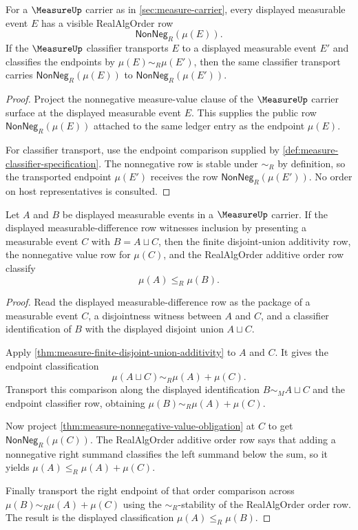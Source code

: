 \begin{theorem}
\label{thm:measure-nonnegative-value-obligation}
For a $\MeasureUp$ carrier as in \autoref{sec:measure-carrier}, every
displayed measurable event $E$ has a visible RealAlgOrder row
$$
\mathsf{NonNeg}_R(\mu(E)).
$$
If the $\MeasureUp$ classifier transports $E$ to a displayed measurable event
$E'$ and classifies the endpoints by $\mu(E)\sim_R\mu(E')$, then the same
classifier transport carries $\mathsf{NonNeg}_R(\mu(E))$ to
$\mathsf{NonNeg}_R(\mu(E'))$.
\end{theorem}
\begin{proof}
Project the nonnegative measure-value clause of the $\MeasureUp$ carrier
surface at the displayed measurable event $E$. This supplies the public row
$\mathsf{NonNeg}_R(\mu(E))$ attached to the same ledger entry as the endpoint
$\mu(E)$.

For classifier transport, use the endpoint comparison supplied by
\autoref{def:measure-classifier-specification}. The nonnegative row is stable
under $\sim_R$ by definition, so the transported endpoint $\mu(E')$ receives
the row $\mathsf{NonNeg}_R(\mu(E'))$. No order on host representatives is
consulted.
\end{proof}

\begin{theorem}
\label{thm:measure-monotone-under-measurable-inclusion}
Let $A$ and $B$ be displayed measurable events in a $\MeasureUp$ carrier. If
the displayed measurable-difference row witnesses inclusion by presenting a
measurable event $C$ with $B=A\sqcup C$, then the finite disjoint-union
additivity row, the nonnegative value row for $\mu(C)$, and the RealAlgOrder
additive order row classify
$$
\mu(A)\le_R\mu(B).
$$
\end{theorem}
\begin{proof}
Read the displayed measurable-difference row as the package of a measurable
event $C$, a disjointness witness between $A$ and $C$, and a classifier
identification of $B$ with the displayed disjoint union $A\sqcup C$.

Apply \autoref{thm:measure-finite-disjoint-union-additivity} to $A$ and $C$.
It gives the endpoint classification
$$
\mu(A\sqcup C)\sim_R\mu(A)+\mu(C).
$$
Transport this comparison along the displayed identification
$B\sim_M A\sqcup C$ and the endpoint classifier row, obtaining
$\mu(B)\sim_R\mu(A)+\mu(C)$.

Now project \autoref{thm:measure-nonnegative-value-obligation} at $C$ to get
$\mathsf{NonNeg}_R(\mu(C))$. The RealAlgOrder additive order row says that
adding a nonnegative right summand classifies the left summand below the sum,
so it yields $\mu(A)\le_R\mu(A)+\mu(C)$.

Finally transport the right endpoint of that order comparison across
$\mu(B)\sim_R\mu(A)+\mu(C)$ using the $\sim_R$-stability of the RealAlgOrder
order row. The result is the displayed classification
$\mu(A)\le_R\mu(B)$.
\end{proof}

